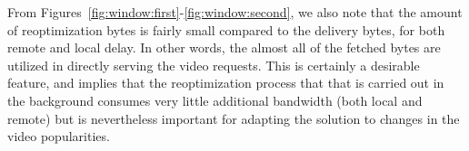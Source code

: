 \documentclass[conference]{IEEEtran}
\begin{document}
From Figures~\ref{fig:window:first}-\ref{fig:window:second}, we also note that the amount of reoptimization bytes is fairly small compared to the delivery bytes, for both remote and local delay. In other words, the almost all of the fetched bytes are utilized in directly serving the video requests. This is certainly a desirable feature, and implies that the reoptimization process that that is carried out in the background consumes very little additional bandwidth (both local and remote) but is nevertheless important for adapting the solution to changes in the video popularities.


\end{document}
